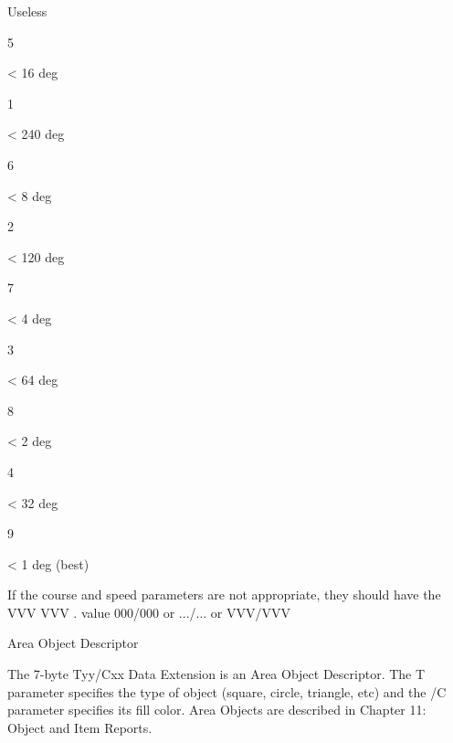 Useless

5

< 16 deg

1

< 240 deg

6

< 8 deg

2

< 120 deg

7

< 4 deg

3

< 64 deg

8

< 2 deg

4

< 32 deg

9

< 1 deg (best)





If the course and speed parameters are not appropriate, they should have the
VVV VVV .
value 000/000 or .../... or VVV/VVV

Area Object
Descriptor

The 7-byte Tyy/Cxx Data Extension is an Area Object Descriptor. The T
parameter specifies the type of object (square, circle, triangle, etc) and the
/C parameter specifies its fill color.
Area Objects are described in Chapter 11: Object and Item Reports.


